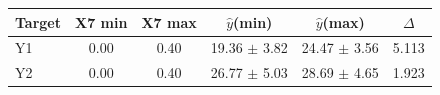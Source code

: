 \begin{tabular}{lccccc}
\toprule
\textbf{Target} & \textbf{X7 min} & \textbf{X7 max} & \textbf{$\hat{y}$(min)} & \textbf{$\hat{y}$(max)} & \textbf{$\Delta$} \\

\midrule
Y1 & 0.00 & 0.40 & 19.36 $\pm$ 3.82 & 24.47 $\pm$ 3.56 & 5.113 \\
Y2 & 0.00 & 0.40 & 26.77 $\pm$ 5.03 & 28.69 $\pm$ 4.65 & 1.923 \\
\bottomrule
\end{tabular}